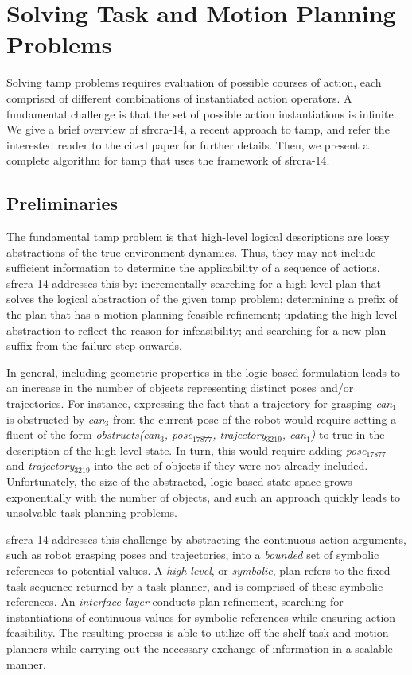 \section{Solving Task and Motion Planning Problems}
Solving {\sc tamp} problems requires evaluation of possible courses of
action, each comprised of different combinations of instantiated
action operators. A fundamental challenge is that the set of possible
action instantiations is infinite.  We give a brief overview of {\sc
  sfrcra-14}, a recent approach to {\sc tamp}, and refer the
interested reader to the cited paper for further details.  Then, we
present a complete algorithm for {\sc tamp} that uses the framework of
{\sc sfrcra-14}.

\subsection{Preliminaries}
The fundamental {\sc tamp} problem is that high-level logical
descriptions are lossy abstractions of the true environment
dynamics. Thus, they may not include sufficient information to
determine the applicability of a sequence of actions.  {\sc sfrcra-14}
addresses this by: incrementally searching for a high-level plan that
solves the logical abstraction of the given {\sc tamp} problem;
determining a prefix of the plan that has a motion planning feasible
refinement; updating the high-level abstraction to reflect the reason
for infeasibility; and searching for a new plan suffix from the
failure step onwards.

In general, including geometric properties in the logic-based
formulation leads to an increase in the number of objects representing
distinct poses and/or trajectories. For instance, expressing the fact
that a trajectory for grasping \emph{can$_1$} is obstructed by
\emph{can$_3$} from the current pose of the robot would require
setting a fluent of the form \emph{obstructs(can$_3$, pose$_{17877}$,
  trajectory$_{3219}$, can$_1$)} to true in the description of the
high-level state. In turn, this would require adding
\emph{pose$_{17877}$} and \emph{trajectory$_{3219}$} into the set of
objects if they were not already included. Unfortunately, the size of
the abstracted, logic-based state space grows exponentially with the
number of objects, and such an approach quickly leads to unsolvable
task planning problems.

{\sc sfrcra-14} addresses this challenge by abstracting the continuous
action arguments, such as robot grasping poses and trajectories, into
a \emph{bounded} set of symbolic references to potential values. A
\emph{high-level}, or \emph{symbolic}, plan refers to the fixed task
sequence returned by a task planner, and is comprised of these symbolic
references. An \emph{interface layer} conducts plan refinement,
searching for instantiations of continuous values for symbolic
references while ensuring action feasibility.  The resulting process
is able to utilize off-the-shelf task and motion planners while
carrying out the necessary exchange of information in a scalable
manner.

